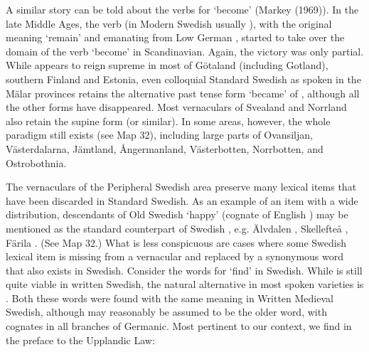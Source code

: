 A similar story can be told about the verbs for ‘become’ (Markey (1969)). In the late Middle Ages, the verb (in Modern Swedish usually ), with the original meaning ‘remain’ and emanating from Low German , started to take over the domain of the verb  ‘become’ in Scandinavian. Again, the victory was only partial. While appears to reign supreme in most of Götaland (including Gotland), southern Finland and Estonia, even colloquial Standard Swedish as spoken in the Mälar provinces retains the alternative past tense form  ‘became’ of , although all the other forms have disappeared. Most vernaculars of Svealand and Norrland also retain the supine form  (or similar). In some areas, however, the whole paradigm still exists (see Map 32), including large parts of Ovansiljan, Västerdalarna, Jämtland, Ångermanland, Västerbotten, Norrbotten, and Ostrobothnia.

The vernaculars of the Peripheral Swedish area preserve many lexical items that have been discarded in Standard Swedish. As an example of an item with a wide distribution, descendants of Old Swedish ‘happy’ (cognate of English ) may be mentioned as the standard counterpart of Swedish , e.g. Älvdalen , Skellefteå , Färila . (See Map 32.) What is less conspicuous are cases where some Swedish lexical item is missing from a vernacular and replaced by a synonymous word that also exists in Swedish. Consider the words for ‘find’ in Swedish. While is still quite viable in written Swedish, the natural alternative in most spoken varieties is . Both these words were found with the same meaning in Written Medieval Swedish, although  may reasonably be assumed to be the older word, with cognates in all branches of Germanic. Most pertinent to our context, we find  in the preface to the Upplandic Law:


